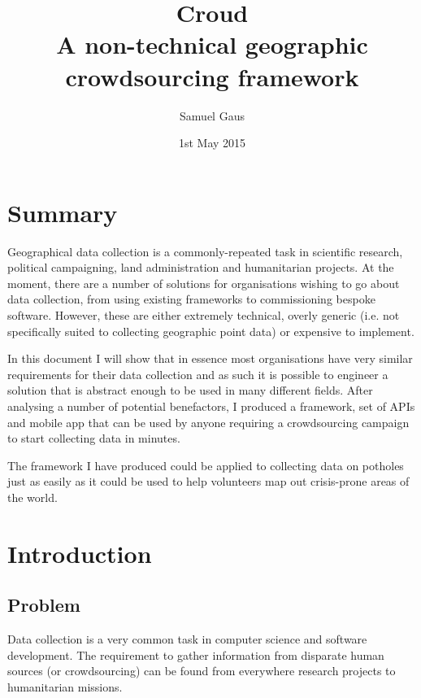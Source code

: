 \documentclass{article}
\let\oldsection\section
\renewcommand\section{\clearpage\oldsection}
\begin{document}
	\title{Croud \\ \vspace{2 mm} {\large A non-technical geographic crowdsourcing framework}}
	\author{Samuel Gaus}
	\date{1st May 2015}
	\maketitle

	\tableofcontents

	\section{Summary}
	\label{sec:summary}
		Geographical data collection is a commonly-repeated task in scientific research, political campaigning, land administration and humanitarian projects.
		At the moment, there are a number of solutions for organisations wishing to go about data collection, from using existing frameworks to commissioning bespoke software.
		However, these are either extremely technical, overly generic (i.e. not specifically suited to collecting geographic point data) or expensive to implement.

		In this document I will show that in essence most organisations have very similar requirements for their data collection and as such it is possible to engineer a solution that is abstract enough to be used in many different fields.
		After analysing a number of potential benefactors, I produced a framework, set of APIs and mobile app that can be used by anyone requiring a crowdsourcing campaign to start collecting data in minutes.

		The framework I have produced could be applied to collecting data on potholes just as easily as it could be used to help volunteers map out crisis-prone areas of the world.

	\section{Introduction}
	\label{sec:introduction}
		\subsection{Problem}
		Data collection is a very common task in computer science and software development. The requirement to gather information from disparate human sources (or crowdsourcing) can be found from everywhere research projects to humanitarian missions.
\end{document}
